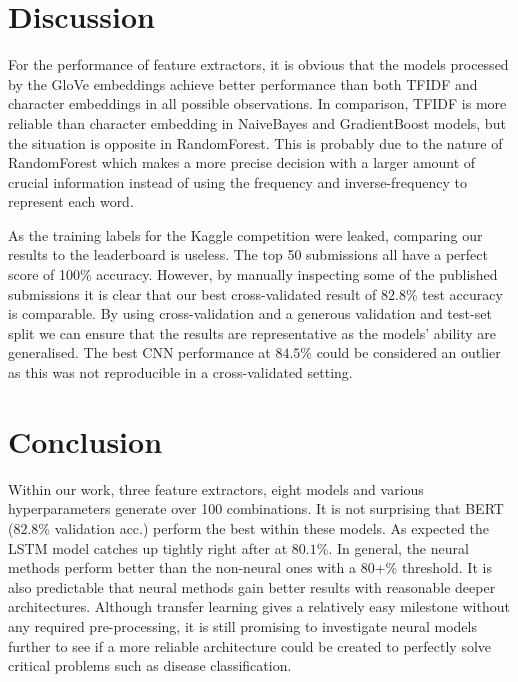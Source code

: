 \documentclass[journal, ]{IEEEtran}
\begin{document}
\section{Discussion}
For the performance of feature extractors, it is obvious that the models processed by the GloVe embeddings achieve better performance than both TFIDF and character embeddings in all possible observations. In comparison, TFIDF is more reliable than character embedding in NaiveBayes and GradientBoost models, but the situation is opposite in RandomForest. This is probably due to the nature of RandomForest which makes a more precise decision with a larger amount of crucial information instead of using the frequency and inverse-frequency to represent each word.

As the training labels for the Kaggle competition were leaked, comparing our results to the leaderboard is useless. The top 50 submissions all have a perfect score of 100\% accuracy. However, by manually inspecting some of the published submissions it is clear that our best cross-validated result of $82.8$\% test accuracy is comparable. By using cross-validation and a generous validation and test-set split we can ensure that the results are representative as the models' ability are generalised. The best CNN performance at $84.5$\% could be considered an outlier as this was not reproducible in a cross-validated setting. 

\section{Conclusion}
Within our work, three feature extractors, eight models and various hyperparameters generate over 100 combinations. It is not surprising that BERT ($82.8$\% validation acc.) perform the best within these models. As expected the LSTM model catches up tightly right after at $80.1$\%. In general, the neural methods perform better than the non-neural ones with a $80$+\% threshold. It is also predictable that neural methods gain better results with reasonable deeper architectures. Although transfer learning gives a relatively easy milestone without any required pre-processing, it is still promising to investigate neural models further to see if a more reliable architecture could be created to perfectly solve critical problems such as disease classification. 

\ifCLASSOPTIONcaptionsoff
  \newpage
\fi
\end{document}
